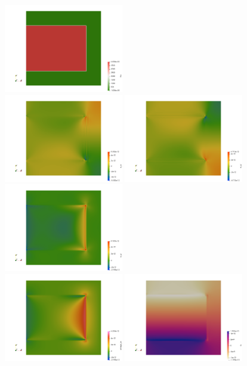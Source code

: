 \begin{center}
\includegraphics[width=5.2cm]{python_codes/fieldstone_64/results/slab/init/rho}\\
\includegraphics[width=5.2cm]{python_codes/fieldstone_64/results/slab/init/exx}
\includegraphics[width=5.2cm]{python_codes/fieldstone_64/results/slab/init/eyy}
\includegraphics[width=5.2cm]{python_codes/fieldstone_64/results/slab/init/exy}\\
\includegraphics[width=5.2cm]{python_codes/fieldstone_64/results/slab/init/oxy}
\includegraphics[width=5.2cm]{python_codes/fieldstone_64/results/slab/init/q}

\end{center}
